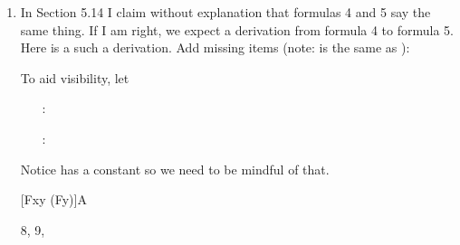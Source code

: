 \begin{enumerate}
{\begin{argumentN}[5]
\end{argumentN}

}{
}
\newpage

  \item In Section 5.14 I claim without explanation that formulas 4 and 5 say 
   the same thing. If I am right, we expect a derivation from formula 4 to 
   formula 5.  Here is a such a derivation. Add missing items (note: 
    is the same as ):

   To aid visibility, let 

   \begin{itemize}

  \item[\p{\Gamma}:]   

 \item[\p{\Delta}:]   \p{Fa\land  \lnot \lthereis y (Fy\land \nident{a}
   {y})]}


\end{itemize}
Notice \p{\Delta} has a constant so we need to be mindful of that.
\begin{argumentN}[1]

\ai[0.15]{\Gamma}
{[Fx\land \lnot \lthereis y (Fy\land {})]}{A}









{8,
 9,
\condE}



\end{argumentN}
\end{enumerate}
